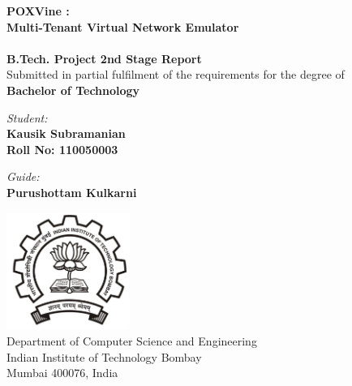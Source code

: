 \begin{titlepage}
\begin{center}

{\Huge \bfseries
POXVine : \\ Multi-Tenant Virtual Network Emulator \\
}~\\[1cm]


{\large \bfseries
B.Tech. Project 2nd Stage Report
}~\\[0.40cm]

{
Submitted in partial fulfilment of the requirements for the degree of
}~\\[0.20cm]

{\large \bfseries
Bachelor of Technology
}\\[2.75cm]
\end{center}

\begin{multicols}{2}
\begin{flushleft}
{\large
\textit{Student:} \\
\textbf{Kausik Subramanian	} \\
\textbf{Roll No: 110050003}
}
\end{flushleft}
\columnbreak
\begin{flushright}
{\large
\textit{Guide:} \\
\textbf{Purushottam Kulkarni}
}
\end{flushright}
\end{multicols}

\vfill

\begin{center}
\includegraphics[width=4cm]{Figures/iitbblack.jpg}~\\[1cm]

{\large
Department of Computer Science and Engineering\\
Indian Institute of Technology Bombay\\
Mumbai 400076, India\\
}

\end{center}
\end{titlepage}